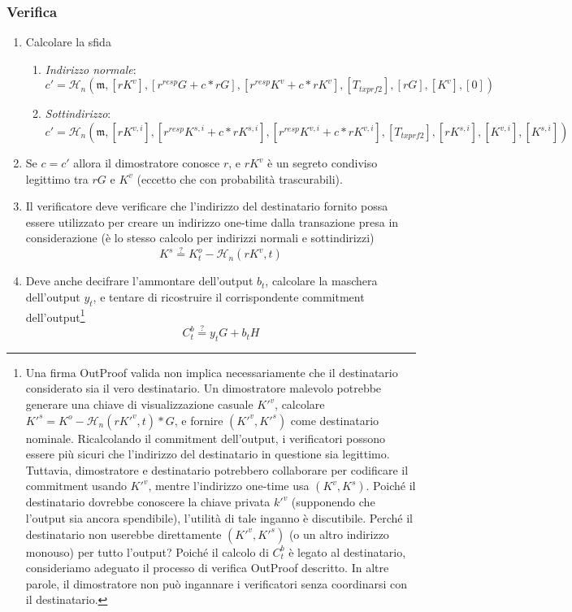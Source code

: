 \subsubsection*{Verifica}

\begin{enumerate}
    \item Calcolare la sfida
    \begin{enumerate}
        \item {\em Indirizzo normale}:\vspace{.145cm}
	    \[c' = \mathcal{H}_n(\mathfrak{m},[rK^v], [r^{resp} G + c*r G], [r^{resp} K^v + c*r K^v], [T_{txprf2}], [rG], [K^v], [0])\]
	    \item {\em Sottindirizzo}:\vspace{.16cm}
	    \[c' = \mathcal{H}_n(\mathfrak{m},[rK^{v,i}], [r^{resp} K^{s,i} + c*r K^{s,i}], [r^{resp} K^{v,i} + c*r K^{v,i}], [T_{txprf2}], [rK^{s,i}], [K^{v,i}], [K^{s,i}])\]
    \end{enumerate}
    \item Se $c = c'$ allora il dimostratore conosce $r$, e $rK^v$ è un segreto condiviso legittimo tra $r G$ e $K^v$ (eccetto che con probabilità trascurabili).
    \item Il verificatore deve verificare che l’indirizzo del destinatario fornito possa essere utilizzato per creare un indirizzo one-time dalla transazione presa in considerazione (è lo stesso calcolo per indirizzi normali e sottindirizzi)
    \[K^s \stackrel{?}{=} K^o_t - \mathcal{H}_n(r K^v,t)\]
    \item Deve anche decifrare l’ammontare dell’output $b_t$, calcolare la maschera dell’output $y_t$, e tentare di ricostruire il corrispondente commitment dell’output\footnote{Una firma OutProof valida non implica necessariamente che il destinatario considerato sia il vero destinatario. Un dimostratore malevolo potrebbe generare una chiave di visualizzazione casuale $K'^v$, calcolare $K'^s = K^o - \mathcal{H}_n(rK'^v,t)*G$, e fornire $(K'^v,K'^s)$ come destinatario nominale. Ricalcolando il commitment dell’output, i verificatori possono essere più sicuri che l’indirizzo del destinatario in questione sia legittimo. Tuttavia, dimostratore e destinatario potrebbero collaborare per codificare il commitment usando $K'^v$, mentre l’indirizzo one-time usa $(K^v,K^s)$. Poiché il destinatario dovrebbe conoscere la chiave privata $k'^v$ (supponendo che l’output sia ancora spendibile), l’utilità di tale inganno è discutibile. Perché il destinatario non userebbe direttamente $(K'^v,K'^s)$ (o un altro indirizzo monouso) per tutto l’output? Poiché il calcolo di $C^b_t$ è legato al destinatario, consideriamo adeguato il processo di verifica OutProof descritto. In altre parole, il dimostratore non può ingannare i verificatori senza coordinarsi con il destinatario.}\vspace{.175cm}
    \[C^b_t \stackrel{?}{=} y_t G + b_t H\]
\end{enumerate}


